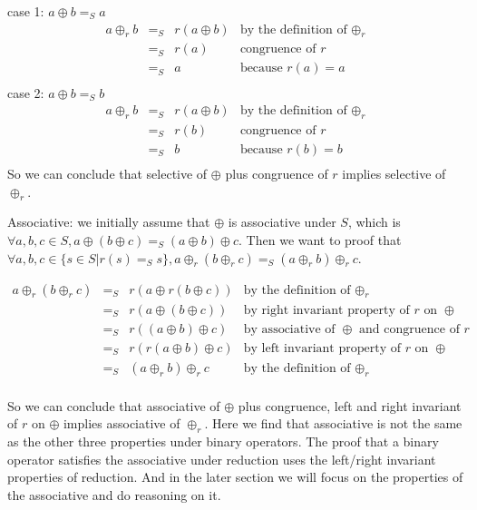 \documentclass[a4paper,12pt,twoside,openright]{report}
\newcommand{\e}[2]{
\begin{equation}
  \label{#1} 
  #2
\end{equation}
}
\begin{document}
case 1: $a \oplus b =_S a$
\[
\begin{array}{rcll} 
a \oplus_r b & =_S & r(a \oplus b) &\mbox{by the definition of $\oplus_r$} \\
			 & =_S & r(a) &\mbox{congruence of $r$}\\
			 & =_S & a &\mbox{because $r(a) = a$}\\
\end{array}
\]
case 2: $a \oplus b =_S b$
\[
\begin{array}{rcll} 
a \oplus_r b & =_S & r(a \oplus b) &\mbox{by the definition of $\oplus_r$} \\
			 & =_S & r(b) &\mbox{congruence of $r$}\\
			 & =_S & b &\mbox{because $r(b) = b$}\\
\end{array}
\]
So we can conclude that selective of $\oplus$ plus congruence of $r$ implies selective of $\oplus_r$.

Associative: we initially assume that $\oplus$ is associative under $S$, which is $\forall a,b,c \in S, a \oplus (b \oplus c) =_S (a \oplus b) \oplus c$. Then we want to proof that $\forall a,b,c \in \{s \in S | r(s) =_S s\}, a \oplus_r (b \oplus_r c) =_S (a \oplus_r b) \oplus_r c$. 
\e{r:proof:associative}{
\begin{array}{rcll} 
a \oplus_r (b \oplus_r c) & =_S & r(a \oplus r(b \oplus c)) &\mbox{by the definition of $\oplus_r$} \\
			 & =_S & r(a \oplus (b \oplus c)) &\mbox{by right invariant property of $r$ on $\oplus$}\\
			 & =_S & r((a \oplus b) \oplus c) &\mbox{by associative of $\oplus$ and congruence of $r$}\\
			 & =_S & r(r(a \oplus b) \oplus c) &\mbox{by left invariant property of $r$ on $\oplus$}\\
             & =_S & (a \oplus_r b) \oplus_r c  &\mbox{by the definition of $\oplus_r$} \\
\end{array}}
So we can conclude that associative of $\oplus$ plus congruence, left and right invariant of $r$ on $\oplus$ implies associative of $\oplus_r$.
Here we find that associative is not the same as the other three properties under binary operators. The proof that a binary operator satisfies the associative under reduction uses the left/right invariant properties of reduction. And in the later section we will focus on the properties of the associative and do reasoning on it. 
\end{document}
